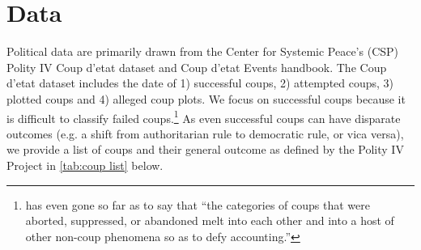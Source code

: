 \documentclass[12pt,final,fleqn]{article}
\theoremstyle{plain}
\begin{document}
\section{Data}
Political data are primarily drawn from the Center for Systemic Peace's (CSP) Polity IV Coup d'etat dataset and Coup d'etat Events handbook. The Coup d'etat dataset includes the date of 1) successful coups, 2) attempted coups, 3) plotted coups and 4) alleged coup plots. We focus on successful coups because it is difficult to classify failed coups.\footnote{\citep[p. 617]{needler1966political} has even gone so far as to say that ``the categories of coups that were aborted, suppressed, or abandoned melt into each other and into a host of other non-coup phenomena so as to defy accounting.''} As even successful coups can have disparate outcomes (e.g. a shift from authoritarian rule to democratic rule, or vica versa), we provide a list of coups and their general outcome as defined by the Polity IV Project in \autoref{tab:coup list} below. 
\end{document}
